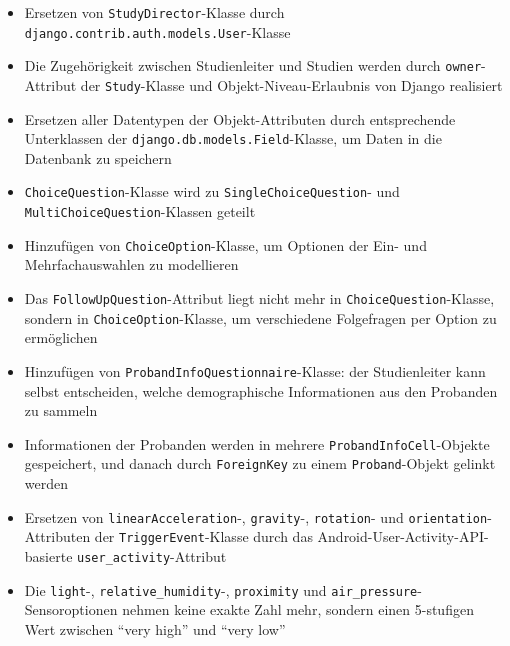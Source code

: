 \documentclass[a4paper]{scrreprt}
\begin{document}
            \begin{itemize}
                \item Ersetzen von \texttt{StudyDirector}-Klasse durch \texttt{django.contrib.auth.models.User}-Klasse

                \item Die Zugehörigkeit zwischen Studienleiter und Studien werden durch \texttt{owner}-Attribut der \texttt{Study}-Klasse und Objekt-Niveau-Erlaubnis von Django realisiert

                \item Ersetzen aller Datentypen der Objekt-Attributen durch entsprechende Unterklassen der \texttt{django.db.models.Field}-Klasse, um Daten in die Datenbank zu speichern

                \item \texttt{ChoiceQuestion}-Klasse wird zu \texttt{SingleChoiceQuestion}- und \texttt{MultiChoiceQuestion}-Klassen geteilt

                \item Hinzufügen von \texttt{ChoiceOption}-Klasse, um Optionen der Ein- und Mehrfachauswahlen zu modellieren

                \item Das \texttt{FollowUpQuestion}-Attribut liegt nicht mehr in \texttt{ChoiceQuestion}-Klasse, sondern in \texttt{ChoiceOption}-Klasse, um verschiedene Folgefragen per Option zu ermöglichen

                \item Hinzufügen von \texttt{ProbandInfoQuestionnaire}-Klasse: der Studienleiter kann selbst entscheiden, welche demographische Informationen aus den Probanden zu sammeln

                \item Informationen der Probanden werden in mehrere \texttt{ProbandInfoCell}-Objekte gespeichert, und danach durch \texttt{ForeignKey} zu einem \texttt{Proband}-Objekt gelinkt werden

                \item Ersetzen von \texttt{linearAcceleration}-, \texttt{gravity}-, \texttt{rotation}- und \texttt{orientation}-Attributen der \texttt{TriggerEvent}-Klasse durch das Android-User-Activity-API-basierte \texttt{user\_activity}-Attribut

                \item Die \texttt{light}-, \texttt{relative\_humidity}-, \texttt{proximity} und \texttt{air\_pressure}-Sensoroptionen nehmen keine exakte Zahl mehr, sondern einen 5-stufigen Wert zwischen “very high” und “very low”


            \end{itemize}
\end{document}
